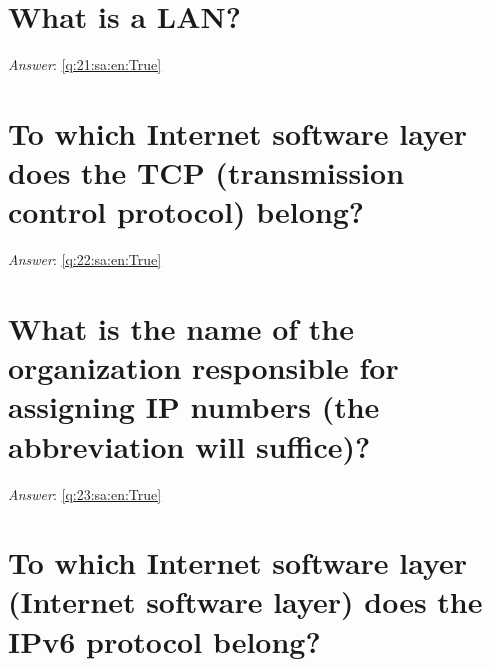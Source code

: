 \documentclass[a4paper,11pt,oneside]{book}
\begin{document}
\begin{sloppypar}
\section{What is a LAN?}

\label{q:21:sa:en:False}

\vspace{2cm}

\noindent\makebox[\textwidth]{\hrulefill}

\vspace{1cm}

\textit{Answer}: \autoref{q:21:sa:en:True}



\section{To which Internet software layer does the TCP (transmission control protocol) belong?}

\label{q:22:sa:en:False}

\vspace{2cm}

\noindent\makebox[\textwidth]{\hrulefill}

\vspace{1cm}

\textit{Answer}: \autoref{q:22:sa:en:True}



\section{What is the name of the organization responsible for assigning IP numbers (the abbreviation will suffice)?}

\label{q:23:sa:en:False}

\vspace{2cm}

\noindent\makebox[\textwidth]{\hrulefill}

\vspace{1cm}

\textit{Answer}: \autoref{q:23:sa:en:True}



\section{To which Internet software layer (Internet software layer) does the IPv6 protocol belong?}

\label{q:24:sa:en:False}

\vspace{2cm}


\end{sloppypar}
\end{document}
